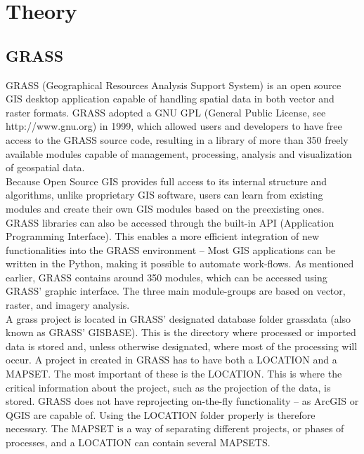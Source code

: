 
\chapter{Theory} %

\label{ch:theory} %


\section{GRASS}

GRASS (Geographical Resources Analysis Support System) is an open source GIS desktop application capable of handling spatial data in both vector and raster formats. 
GRASS adopted a GNU GPL (General Public License, see http://www.gnu.org) in 1999, which allowed users and developers to have free access to the GRASS source code, resulting in a library of more than 350 freely available modules capable of management, processing, analysis and visualization of geospatial data.\\
Because Open Source GIS provides full access to its internal structure and algorithms, unlike proprietary GIS software, users can learn from existing modules and create their own GIS modules based on the preexisting ones. GRASS libraries can also be accessed through the built-in API (Application Programming Interface). This enables a more efficient integration of new functionalities into the GRASS environment – Most GIS applications can be written in the Python, making it possible to automate work-flows.
As mentioned earlier, GRASS contains around 350 modules, which can be accessed using GRASS' graphic interface. The three main module-groups are based on vector, raster, and imagery analysis.\\
A grass project is located in GRASS' designated database folder grassdata (also known as GRASS' GISBASE). This is the directory where processed or imported data is stored and, unless otherwise designated, where most of the processing will occur. 
A project in created in GRASS has to have both a LOCATION and a MAPSET.
The most important of these is the LOCATION. This is where the critical information about the project, such as the projection of the data, is stored. 
GRASS does not have reprojecting on-the-fly functionality – as ArcGIS or QGIS are capable of. Using the LOCATION folder properly is therefore necessary. 
The MAPSET is a way of separating different projects, or phases of processes, and a LOCATION can contain several MAPSETS. 


